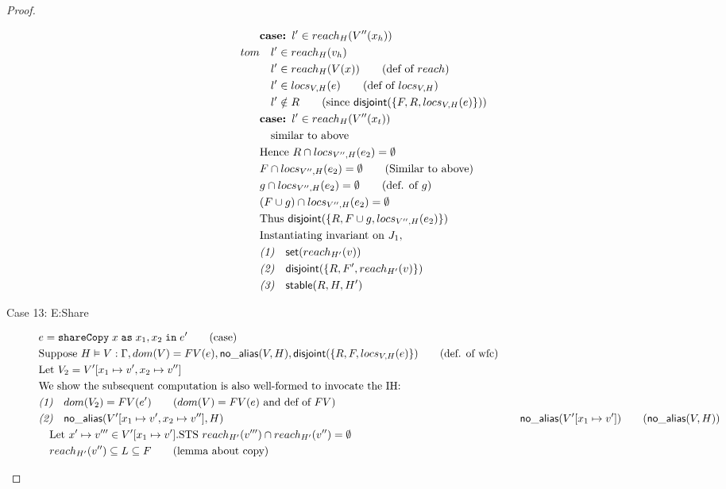 \documentclass[11pt]{article}
\newcommand{\ms}[1]{\ensuremath{\mathsf{#1}}}
\newcommand{\irl}[1]{\mathtt{#1}}
\newcommand{\na}[1]{\mathsf{no\_alias}(#1)}
\newcommand{\stable}[1]{\mathsf{stable}(#1)}
\newcommand{\dist}[1]{\mathsf{disjoint}(#1)}
\newcommand{\sharecpcst}[4]{\irl{shareCopy}\;#1\;\irl{as}\;#2,#3\;\irl{in}\;#4}
\theoremstyle{definition}
\begin{document}
\begin{proof}
\begin{description}
\begin{align*}
  &\textbf{case: }  l' \in reach_{H}(V''(x_h)) \\tom
  &\quad l' \in reach_{H}(v_h)\\
  &\quad l' \in reach_{H}(V(x)) \tag{def of $reach$}\\
  &\quad l' \in locs_{V,H}(e) \tag{def of $locs_{V,H}$}\\
  &\quad l' \notin R \tag{since $\dist{\{F,R,locs_{V,H}(e)\}}$}\\
  &\textbf{case: }  l' \in reach_{H}(V''(x_t)) \\
  &\quad \text{similar to above}\\
  &\text{Hence } R \cap locs_{V'',H}(e_2) = \emptyset\\
  &F \cap locs_{V'',H}(e_2) = \emptyset \tag{Similar to above}\\
  &g \cap locs_{V'',H}(e_2) = \emptyset \tag{def. of $g$}\\
  &(F \cup g) \cap locs_{V'',H}(e_2) = \emptyset\\
  &\text{Thus } \dist{\{R,F \cup g,locs_{V'',H}(e_2)\}}\\
  &\text{Instantiating invariant on } J_1,\\
  &\emph{(1)} \quad \ms{set}(reach_{H'}(v))\\
  &\emph{(2)} \quad\dist{\{R,F',reach_{H'}(v)\}}\\
  &\emph{(3)} \quad\stable{R,H,H'}\\
  \end{align*}
	\item [Case 13: E:Share]
  \begin{align*}
  &e = \sharecpcst{x}{x_1}{x_2}{e'} \tag{case}\\
  &\text{Suppose } H \vDash V : \Gamma, dom(V) = FV(e), \na{V,H}, \dist{\{R,F,locs_{V,H}(e)\}} 
		\tag{def. of wfc} \\
	&\text{Let } V_2 = V'[x_1 \mapsto v', x_2 \mapsto v'']\\
	&\text{We show the subsequent computation is also well-formed to invocate the IH:}\\
  &\emph{(1)} \quad dom(V_2) = FV(e') \tag{$dom(V) = FV(e)$ and def of $FV$}\\
  &\emph{(2)} \quad \na{V'[x_1 \mapsto v', x_2 \mapsto v''],H}
	&\quad \na{V'[x_1 \mapsto v']} \tag{$\na{V,H}$}\\
  &\quad \text{Let } x' \mapsto v''' \in V'[x_1 \mapsto v']. 
		\text{STS } reach_{H'}(v''') \cap reach_{H'}(v'') = \emptyset\\
	&\quad reach_{H'}(v'') \subseteq L \subseteq F \tag{lemma about copy}\\

\end{align*}
\end{description}
\end{proof}
\end{document}
